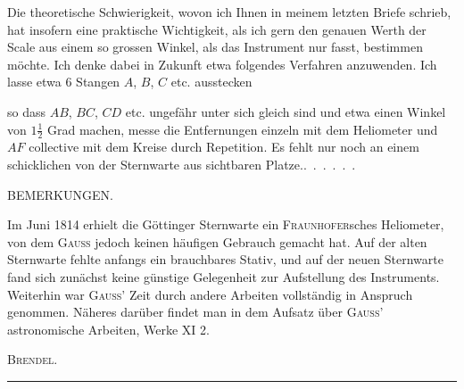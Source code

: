 \noindent\hspace*{\parindent}Die theoretische Schwierigkeit, wovon ich Ihnen in meinem letzten Briefe schrieb, hat insofern eine praktische Wichtigkeit, als ich gern den genauen Werth der Scale aus einem so grossen Winkel, als das Instrument nur fasst, bestimmen möchte. Ich denke dabei in Zukunft etwa folgendes Verfahren anzuwenden. Ich lasse etwa 6 Stangen $A$, $B$, $C$ etc. ausstecken
\begin{center}\end{center}
\noindent so dass $AB$, $BC$, $CD$ etc. ungefähr unter sich gleich sind und etwa einen Winkel von $1\frac12$ Grad machen, messe die Entfernungen einzeln mit dem Heliometer und $AF$ collective mit dem Kreise durch Repetition. Es fehlt nur noch an einem schicklichen von der Sternwarte aus sichtbaren Platze.\quad\mbox{. . . . . .}
\begin{center}BEMERKUNGEN.\end{center}
\begingroup\small
\noindent\hspace*{\parindent}Im Juni 1814 erhielt die Göttinger Sternwarte ein \textsc{Fraunhofer}sches Heliometer, von dem \textsc{Gauss} jedoch keinen häufigen Gebrauch gemacht hat. Auf der alten Sternwarte fehlte anfangs ein brauchbares Stativ, und auf der neuen Sternwarte fand sich zunächst keine günstige Gelegenheit zur Aufstellung des Instruments. Weiterhin war \textsc{Gauss}' Zeit durch andere Arbeiten vollständig in Anspruch genommen. Näheres darüber findet man in dem Aufsatz über \textsc{Gauss}' astronomische Arbeiten, Werke XI 2.
\begin{flushright}\textsc{Brendel}.\end{flushright}
\endgroup
\begin{center}\rule{.31\textwidth}{.35pt}\end{center}
\clearpage\endgroup
